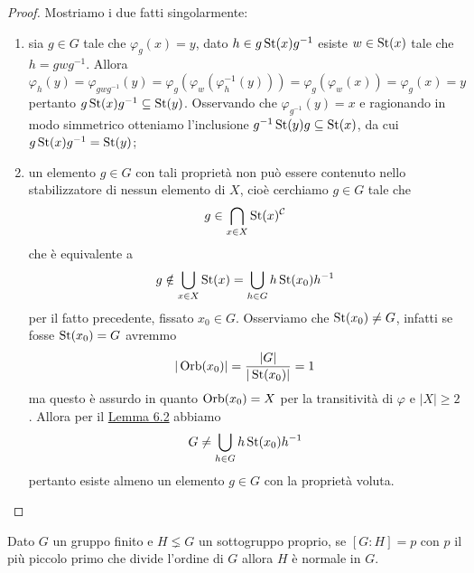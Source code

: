 \documentclass[11pt]{scrartcl}
\begin{document}
\begin{proof}
    Mostriamo i due fatti singolarmente:
    \begin{enumerate}[(1)]
        \item sia $g \in G$ tale che $\varphi_g(x) = y$, dato 
        $h \in g\operatorname{St}(x)g^{-1}$ esiste $w \in \operatorname{St}(x)$ tale che $h = gwg^{-1}$. 
        Allora
        \[
            \varphi_h(y) = \varphi_{gwg^{-1}}(y) = 
            \varphi_g(\varphi_w(\varphi_h^{-1}(y))) = \varphi_g(\varphi_w(x)) =
            \varphi_g(x) = y
        \]pertanto $g\operatorname{St}(x)g^{-1} \subseteq \operatorname{St}(y)$. Osservando che 
        $\varphi_{g^{-1}}(y) = x$ e ragionando in modo simmetrico otteniamo
        l'inclusione $g^{-1}\operatorname{St}(y)g \subseteq \operatorname{St}(x)$, da cui $g\operatorname{St}(x)g^{-1} = \operatorname{St}(y)$;
        \item un elemento $g \in G$ con tali proprietà non può essere contenuto 
        nello stabilizzatore di nessun elemento di $X$, cioè cerchiamo $g \in G$
        tale che
        \[
            g \in \bigcap_{x \in X}\operatorname{St}(x)^{\mathcal{C}}
        \]
        che è equivalente a
        \[
            g \notin \bigcup_{x \in X} \operatorname{St}(x) = \bigcup_{h \in G}h\operatorname{St}(x_0)h^{-1}
        \]per il fatto precedente, fissato $x_0 \in G$. Osserviamo che 
        $\operatorname{St}(x_0) \neq G$, infatti se fosse $\operatorname{St}(x_0) = G$ avremmo 
        \[
            |\operatorname{Orb}(x_0)| = \frac{|G|}{|\operatorname{St}(x_0)|} = 1
        \]ma questo è assurdo in quanto $\operatorname{Orb}(x_0) = X$ per la transitività di 
        $\varphi$ e $|X|\geqslant 2$. Allora per il \hyperref[lemma2.0]{Lemma 6.2}
        abbiamo 
        \[
            G \neq \bigcup_{h \in G}h\operatorname{St}(x_0)h^{-1}
        \]pertanto esiste almeno un elemento $g\in G$ con la proprietà voluta.
    \end{enumerate}
\end{proof}

\begin{proposition}
    Dato $G$ un gruppo finito e $H \lneq G$ un sottogruppo proprio, se $[G:H] = p$
    con $p$ il più piccolo primo che divide l'ordine di $G$ allora $H$ è normale
    in $G$.
\end{proposition}
\end{document}
